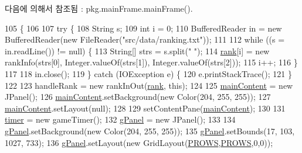 다음에 의해서 참조됨 \+:  pkg.\+main\+Frame.\+main\+Frame().


\begin{DoxyCode}
105                              \{
106         
107         \textcolor{keywordflow}{try} \{
108             String s;
109             \textcolor{keywordtype}{int} i = 0;
110             BufferedReader in = \textcolor{keyword}{new} BufferedReader(\textcolor{keyword}{new} FileReader(\textcolor{stringliteral}{"src/data/ranking.txt"}));
111               
112             \textcolor{keywordflow}{while} ((s = in.readLine()) != null) \{
113                 String[] strs = s.split(\textcolor{stringliteral}{" "});
114                 \hyperlink{classpkg_1_1main_frame_a4a021c36a28ece6900f13d2254e13a96}{rank}[i] = \textcolor{keyword}{new} rankInfo(strs[0], Integer.valueOf(strs[1]), Integer.valueOf(strs[2]));
115                 i++;
116             \}
117               
118             in.close();
119         \} \textcolor{keywordflow}{catch} (IOException e) \{
120             e.printStackTrace();
121         \}
122         
123         handleRank = \textcolor{keyword}{new} rankInOut(\hyperlink{classpkg_1_1main_frame_a4a021c36a28ece6900f13d2254e13a96}{rank}, \textcolor{keyword}{this});
124         
125         \hyperlink{classpkg_1_1main_frame_ac52666e4454808a34bc19f554aba065b}{mainContent} = \textcolor{keyword}{new} JPanel();
126         \hyperlink{classpkg_1_1main_frame_ac52666e4454808a34bc19f554aba065b}{mainContent}.setBackground(\textcolor{keyword}{new} Color(204, 255, 255));
127         \hyperlink{classpkg_1_1main_frame_ac52666e4454808a34bc19f554aba065b}{mainContent}.setLayout(null);
128         
129         setContentPane(\hyperlink{classpkg_1_1main_frame_ac52666e4454808a34bc19f554aba065b}{mainContent});
130         
131         \hyperlink{classpkg_1_1main_frame_aa204a940456c1c064259cafdd59434a6}{timer} = \textcolor{keyword}{new} gameTimer();
132         \hyperlink{classpkg_1_1main_frame_a17ea45ba089445a24b9da9bf561f6603}{gPanel} = \textcolor{keyword}{new} JPanel();
133         
134         \hyperlink{classpkg_1_1main_frame_a17ea45ba089445a24b9da9bf561f6603}{gPanel}.setBackground(\textcolor{keyword}{new} Color(204, 255, 255));
135         \hyperlink{classpkg_1_1main_frame_a17ea45ba089445a24b9da9bf561f6603}{gPanel}.setBounds(17, 103, 1027, 733);
136         \hyperlink{classpkg_1_1main_frame_a17ea45ba089445a24b9da9bf561f6603}{gPanel}.setLayout(\textcolor{keyword}{new} GridLayout(\hyperlink{classpkg_1_1main_frame_a6d9a76db81895214a2acaab598dc2a7c}{PROWS},\hyperlink{classpkg_1_1main_frame_a6d9a76db81895214a2acaab598dc2a7c}{PROWS},0,0));

\end{DoxyCode}
